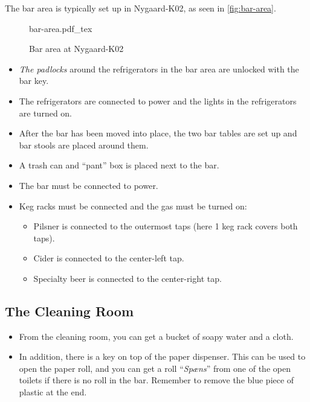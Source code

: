 The bar area is typically set up in Nygaard-K02, as seen in \autoref{fig:bar-area}.

\begin{figure}[t]
	\centering
	\def\svgwidth{\columnwidth}
	{\small{bar-area.pdf_tex}}
	\caption{Bar area at Nygaard-K02}
	\label{fig:bar-area}
\end{figure}

\begin{itemize}
    \item \textit{The padlocks} around the refrigerators in the bar area are unlocked with the bar key.
	\item The refrigerators are connected to power and the lights in the refrigerators are turned on.
	\item After the bar has been moved into place, the two bar tables are set up and bar stools are placed around them.
	\item A trash can and ``pant'' box is placed next to the bar.
	\item The bar must be connected to power.
	\item Keg racks must be connected and the gas must be turned on:
	\begin{itemize}
		\item Pilsner is connected to the outermost taps (here 1 keg rack covers both taps).
		\item Cider is connected to the center-left tap.
		\item Specialty beer is connected to the center-right tap.
	\end{itemize}
\end{itemize}

\subsection{The Cleaning Room}
\label{sec:pre:cleaning-room}

\begin{itemize}
	\item From the cleaning room, you can get a bucket of soapy water and a cloth.
	\item In addition, there is a key on top of the paper dispenser. This can be used to
	open the paper roll, and you can get a roll ``\textit{Spæns}''
	from one of the open toilets if there is no roll in the bar.
	Remember to remove the blue piece of plastic at the end.
\end{itemize}
